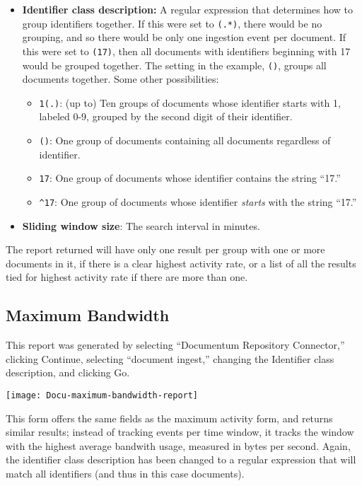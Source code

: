 \begin{changemargin}{1.5in}{0in}
\begin{itemize}
\item \textbf{Identifier class description:} A regular expression
that determines how to group identifiers together. If this were set to
\texttt{(.*)}, there would be no grouping, and so there would be only one
ingestion event per document. If this were set to \texttt{(17)},
then all documents with identifiers beginning with 17 would be grouped
together. The setting in the example, \texttt{()}, groups all
documents together. Some other possibilities:

\begin{itemize}

\item \texttt{1(.)}: (up to) Ten groups of documents whose identifier starts
with 1, labeled 0-9, grouped by the second digit of their identifier.

\item \texttt{()}: One group of documents containing all documents 
regardless of identifier.

\item \texttt{17}: One group of documents whose identifier contains
the string ``17.''

\item \texttt{\^{}17}: One group of documents whose identifier \emph{starts}
with the string ``17.''

\end{itemize}

\item \textbf{Sliding window size}: The search interval in minutes.

\end{itemize}

The report returned will have only one result per group with one or more
documents in it, if there is a clear highest activity rate, or a list of
all the results tied for highest activity rate if there are more than one.

\subsection{Maximum Bandwidth}

This report was generated by selecting ``Documentum Repository Connector,''
clicking Continue, selecting ``document ingest,'' changing the Identifier
class description, and clicking Go.

\texttt{[image: Docu-maximum-bandwidth-report]}

This form offers the same fields as the maximum activity form, and
returns similar results; instead of tracking events per time window,
it tracks the window with the highest average bandwith usage, measured
in bytes per second. Again, the identifier class description has been
changed to a regular expression that will match all identifiers (and
thus in this case documents).


\end{changemargin}
